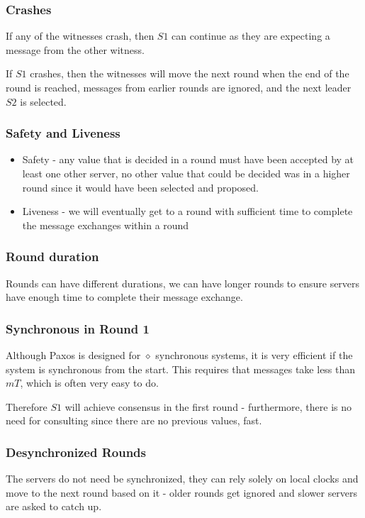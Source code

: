 \documentclass[11pt]{article}
\begin{document}
\subsubsection{Crashes}
If any of the witnesses crash, then $S1$ can continue as they are expecting a message from the other witness.

If $S1$ crashes, then the witnesses will move the next round when the end of the round is reached, messages from earlier rounds are ignored, and the next leader $S2$ is selected.

\subsubsection{Safety and Liveness}
\begin{itemize}
  \item Safety - any value that is decided in a round must have been accepted by at least one other server, no other value that could be decided was in a higher round since it would have been selected and proposed.
  \item Liveness - we will eventually get to a round with sufficient time to complete the message exchanges within a round
\end{itemize}

\subsubsection{Round duration}
Rounds can have different durations, we can have longer rounds to ensure servers have enough time to complete their message exchange.

\subsubsection{Synchronous in Round 1}
Although Paxos is designed for $\diamond$ synchronous systems, it is very efficient if the system is synchronous from the start.
This requires that messages take less than $mT$, which is often very easy to do.

Therefore $S1$ will achieve consensus in the first round - furthermore, there is no need for consulting since there are no previous values, fast.

\subsubsection{Desynchronized Rounds}
The servers do not need be synchronized, they can rely solely on local clocks and move to the next round based on it - older rounds get ignored and slower servers are asked to catch up.
\end{document}
